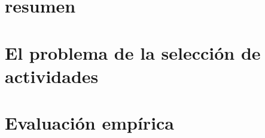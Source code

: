 \documentclass{./packages/informe}
\begin{document}
 



\section*{resumen}


\tableofcontents
\newpage

\section{El problema de la selección de actividades}

\newpage

\section{Evaluación empírica}

\newpage

% 

% 
% 
\end{document}
